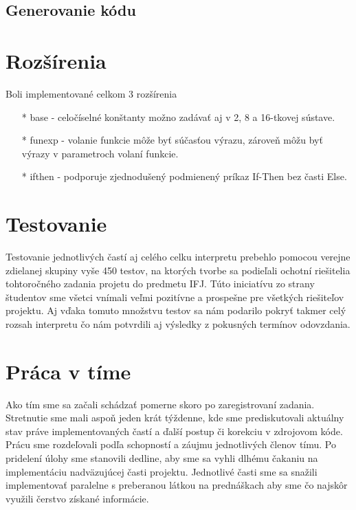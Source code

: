 \documentclass{article}
\begin{document}
        \subsection{Generovanie kódu}
        
    \section{Rozšírenia}
    Boli implementované celkom 3 rozšírenia
        \begin{itemize}
            \item[*] base - celočíselné konštanty možno zadávať aj v 2, 8 a 16-tkovej sústave.
            \item[*] funexp - volanie funkcie môže byť súčasťou výrazu, zároveň môžu byť výrazy
            v parametroch volaní funkcie.
            \item[*] ifthen - podporuje zjednodušený podmienený príkaz If-Then bez časti Else.
        \end{itemize}
    
    \section{Testovanie}
    Testovanie jednotlivých častí aj celého celku interpretu prebehlo pomocou verejne zdielanej 
    skupiny vyše 450 testov, na ktorých tvorbe sa podieľali ochotní riešitelia tohtoročného 
    zadania projetu do predmetu IFJ. Túto iniciatívu zo strany študentov sme všetci vnímali
    veľmi pozitívne a prospešne pre všetkých riešiteľov projektu. Aj vďaka tomuto množstvu 
    testov sa nám podarilo pokryť takmer celý rozsah interpretu čo nám potvrdili aj výsledky
    z pokusných termínov odovzdania.
    
    \section{Práca v tíme}
    Ako tím sme sa začali schádzať pomerne skoro po zaregistrovaní zadania. Stretnutie sme mali aspoň
    jeden krát týždenne, kde sme prediskutovali aktuálny stav práve implementovaných častí a ďalší 
    postup či korekciu v zdrojovom kóde. Prácu sme rozdeľovali podľa schopností a záujmu jednotlivých
    členov tímu. Po pridelení úlohy sme stanovili dedline, aby sme sa vyhli dlhému čakaniu na 
    implementáciu nadväzujúcej časti projektu. Jednotlivé časti sme sa snažili implementovať paralelne
    s preberanou látkou na prednáškach aby sme čo najskôr využili čerstvo získané informácie.
\end{document}
